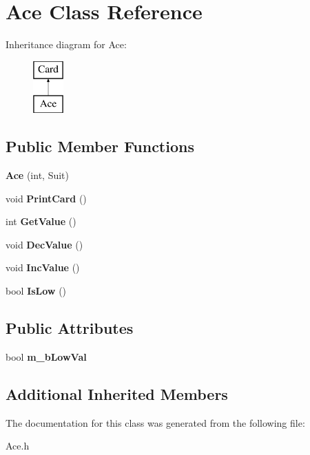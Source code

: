 \hypertarget{class_ace}{}\section{Ace Class Reference}
\label{class_ace}
Inheritance diagram for Ace\+:\begin{figure}[H]
\begin{center}
\leavevmode
\includegraphics[height=2.000000cm]{class_ace}
\end{center}
\end{figure}
\subsection*{Public Member Functions}
\begin{DoxyCompactItemize}
\item 
{\bfseries Ace} (int, Suit)\hypertarget{class_ace_a56ff024bb9b079f04cec836ac3ba389c}{}\label{class_ace_a56ff024bb9b079f04cec836ac3ba389c}

\item 
void {\bfseries Print\+Card} ()\hypertarget{class_ace_a050c43881616cd6bd2cccaf18cffca45}{}\label{class_ace_a050c43881616cd6bd2cccaf18cffca45}

\item 
int {\bfseries Get\+Value} ()\hypertarget{class_ace_adfb0f5e0a407d142b194ca3fc0c821a3}{}\label{class_ace_adfb0f5e0a407d142b194ca3fc0c821a3}

\item 
void {\bfseries Dec\+Value} ()\hypertarget{class_ace_ababf90507705afe181768744c2cf7831}{}\label{class_ace_ababf90507705afe181768744c2cf7831}

\item 
void {\bfseries Inc\+Value} ()\hypertarget{class_ace_ac6e447fe80821643237c71f92e73adcd}{}\label{class_ace_ac6e447fe80821643237c71f92e73adcd}

\item 
bool {\bfseries Is\+Low} ()\hypertarget{class_ace_a8aa71eb43584d2e6cf56809d2b13b562}{}\label{class_ace_a8aa71eb43584d2e6cf56809d2b13b562}

\end{DoxyCompactItemize}
\subsection*{Public Attributes}
\begin{DoxyCompactItemize}
\item 
bool {\bfseries m\+\_\+b\+Low\+Val}\hypertarget{class_ace_a984604c0e554b5fd3e77e12082c25fd9}{}\label{class_ace_a984604c0e554b5fd3e77e12082c25fd9}

\end{DoxyCompactItemize}
\subsection*{Additional Inherited Members}


The documentation for this class was generated from the following file\+:\begin{DoxyCompactItemize}
\item 
Ace.\+h\end{DoxyCompactItemize}
